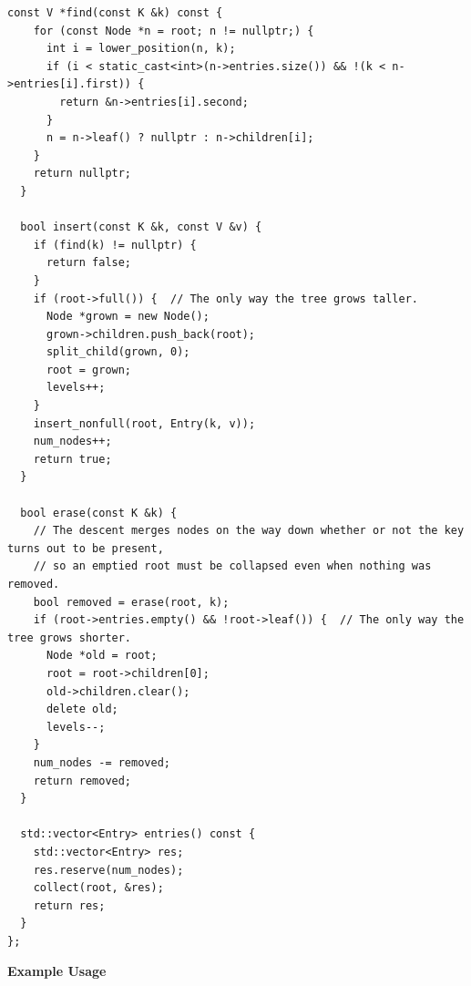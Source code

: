 \begin{lstlisting}[style=cpp]
  const V *find(const K &k) const {
    for (const Node *n = root; n != nullptr;) {
      int i = lower_position(n, k);
      if (i < static_cast<int>(n->entries.size()) && !(k < n->entries[i].first)) {
        return &n->entries[i].second;
      }
      n = n->leaf() ? nullptr : n->children[i];
    }
    return nullptr;
  }

  bool insert(const K &k, const V &v) {
    if (find(k) != nullptr) {
      return false;
    }
    if (root->full()) {  // The only way the tree grows taller.
      Node *grown = new Node();
      grown->children.push_back(root);
      split_child(grown, 0);
      root = grown;
      levels++;
    }
    insert_nonfull(root, Entry(k, v));
    num_nodes++;
    return true;
  }

  bool erase(const K &k) {
    // The descent merges nodes on the way down whether or not the key turns out to be present,
    // so an emptied root must be collapsed even when nothing was removed.
    bool removed = erase(root, k);
    if (root->entries.empty() && !root->leaf()) {  // The only way the tree grows shorter.
      Node *old = root;
      root = root->children[0];
      old->children.clear();
      delete old;
      levels--;
    }
    num_nodes -= removed;
    return removed;
  }

  std::vector<Entry> entries() const {
    std::vector<Entry> res;
    res.reserve(num_nodes);
    collect(root, &res);
    return res;
  }
};
\end{lstlisting}
\textbf{Example Usage}\par
